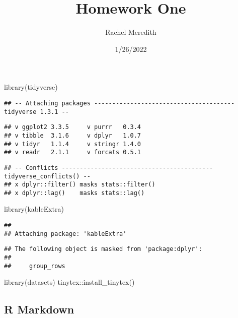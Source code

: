 \documentclass[
]{article}
\title{Homework One}
\author{Rachel Meredith}
\date{1/26/2022}
\newenvironment{Shaded}{\begin{snugshade}}{\end{snugshade}}
\newcommand{\FunctionTok}[1]{\textcolor[rgb]{0.00,0.00,0.00}{#1}}
\newcommand{\NormalTok}[1]{#1}
\newcommand{\SpecialCharTok}[1]{\textcolor[rgb]{0.00,0.00,0.00}{#1}}
\begin{document}
\maketitle

\begin{Shaded}
\begin{Highlighting}[]
\FunctionTok{library}\NormalTok{(tidyverse)}
\end{Highlighting}
\end{Shaded}

\begin{verbatim}
## -- Attaching packages --------------------------------------- tidyverse 1.3.1 --
\end{verbatim}

\begin{verbatim}
## v ggplot2 3.3.5     v purrr   0.3.4
## v tibble  3.1.6     v dplyr   1.0.7
## v tidyr   1.1.4     v stringr 1.4.0
## v readr   2.1.1     v forcats 0.5.1
\end{verbatim}

\begin{verbatim}
## -- Conflicts ------------------------------------------ tidyverse_conflicts() --
## x dplyr::filter() masks stats::filter()
## x dplyr::lag()    masks stats::lag()
\end{verbatim}

\begin{Shaded}
\begin{Highlighting}[]
\FunctionTok{library}\NormalTok{(kableExtra)}
\end{Highlighting}
\end{Shaded}

\begin{verbatim}
## 
## Attaching package: 'kableExtra'
\end{verbatim}

\begin{verbatim}
## The following object is masked from 'package:dplyr':
## 
##     group_rows
\end{verbatim}

\begin{Shaded}
\begin{Highlighting}[]
\FunctionTok{library}\NormalTok{(datasets)}
\NormalTok{tinytex}\SpecialCharTok{::}\FunctionTok{install\_tinytex}\NormalTok{()}
\end{Highlighting}
\end{Shaded}

\hypertarget{r-markdown}{%
\subsection{R Markdown}\label{r-markdown}}
\end{document}
